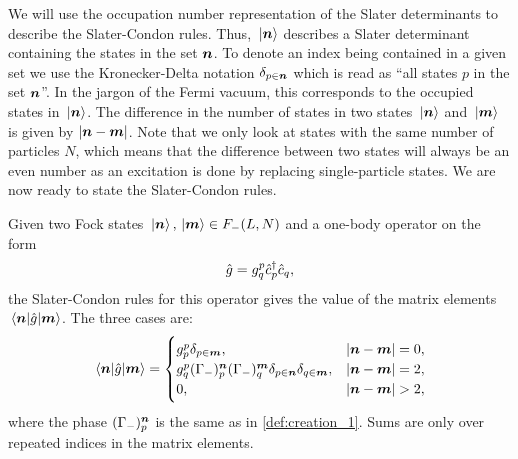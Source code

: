             We will use the occupation number representation of the Slater
            determinants to describe the Slater-Condon rules.
            Thus, $\ket*{\boldsymbol{n}}$ describes a Slater determinant containing the
            states in the set $\boldsymbol{n}$.
            To denote an index being contained in a given set we use the
            Kronecker-Delta notation $\delta_{p \in \boldsymbol{n}}$ which is read as
            ``all states $p$ in the set $\boldsymbol{n}$''.
            In the jargon of the Fermi vacuum, this corresponds to the occupied
            states in $\ket*{\boldsymbol{n}}$.
            The difference in the number of states in two states $\ket*{\boldsymbol{n}}$
            and $\ket*{\boldsymbol{m}}$ is given by $\abs{\boldsymbol{n} - \boldsymbol{m}}$.
            Note that we only look at states with the same number of particles
            $N$, which means that the difference between two states will always
            be an even number as an excitation is done by replacing
            single-particle states.
            We are now ready to state the Slater-Condon rules.
            \begin{lemma}
                \label{lemma:slater-condon-one-body}
                Given two Fock states $\ket*{\boldsymbol{n}}, \ket*{\boldsymbol{m}} \in F_{-}(L,
                N)$ and a one-body operator on the form
                \begin{align}
                    \hat{g} = g^{p}_{q}\hat{c}_{p}^{\dagger}\hat{c}_{q},
                \end{align}
                the Slater-Condon rules for this operator gives the value of the
                matrix elements $\mel*{\boldsymbol{n}}{\hat{g}}{\boldsymbol{m}}$.
                The three cases are:
                \begin{gather}
                    \mel*{\boldsymbol{n}}{\hat{g}}{\boldsymbol{m}}
                    = \begin{cases}
                        g^{p}_{p}\delta_{p \in \boldsymbol{m}},
                        & \abs{\boldsymbol{n} - \boldsymbol{m}} = 0,
                        \\
                        g^{p}_{q}
                        (\Gamma_{-})^{\boldsymbol{n}}_{p}
                        (\Gamma_{-})^{\boldsymbol{m}}_{q}
                        \delta_{p \in \boldsymbol{n}}
                        \delta_{q \in \boldsymbol{m}},
                        & \abs{\boldsymbol{n} - \boldsymbol{m}} = 2,
                        \\
                        0, & \abs{\boldsymbol{n} - \boldsymbol{m}} > 2,
                    \end{cases}
                \end{gather}
                where the phase $(\Gamma_{-})^{\boldsymbol{n}}_{p}$ is the same as in
                \autoref{def:creation_1}.
                Sums are only over repeated indices in the matrix elements.
            \end{lemma}
